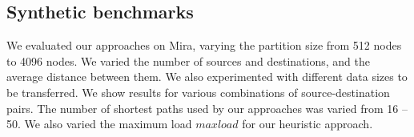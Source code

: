 \subsection{Synthetic benchmarks}

We evaluated our approaches on Mira, varying the partition size from 512 nodes to 4096 nodes. %
We varied the number of sources and destinations, and the average distance between them. 
We also experimented with different data sizes to be transferred. 
We show results for various combinations of source-destination pairs. 
The number of shortest paths used by our approaches was varied from 16 -- 50. %
We also varied the maximum load $maxload$ for our heuristic approach. 
